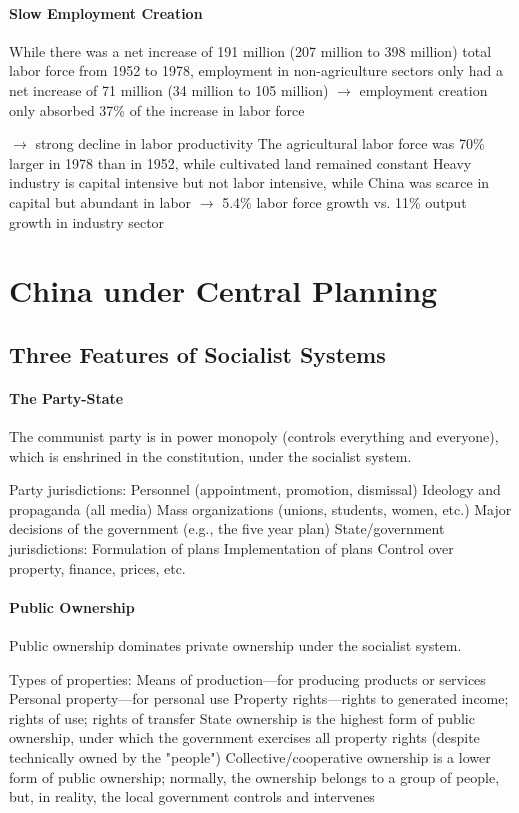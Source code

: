 \documentclass[11pt]{article}
\theoremstyle{definition}
\theoremstyle{remark}
\begin{document}
\paragraph{Slow Employment Creation}
While there was a net increase of 191 million (207 million to 398 million) total labor force from 1952 to 1978, employment in non-agriculture sectors only had a net increase of 71 million (34 million to 105 million) $\to$ employment creation only absorbed 37\% of the increase in labor force
\begin{outline}[enumerate] $\to$ strong decline in labor productivity
\1 The agricultural labor force was 70\% larger in 1978 than in 1952, while cultivated land remained constant
\1 Heavy industry is capital intensive but not labor intensive, while China was scarce in capital but abundant in labor $\to$ 5.4\% labor force growth vs. 11\% output growth in industry sector
\end{outline}
\clearpage

\section{China under Central Planning}
\subsection{Three Features of Socialist Systems}
\paragraph{The Party-State} The communist party is in power monopoly (controls everything and everyone), which is enshrined in the constitution, under the socialist system.
\begin{outline}[enumerate]
\1 Party jurisdictions:
	\2 Personnel (appointment, promotion, dismissal)
	\2 Ideology and propaganda (all media)
	\2 Mass organizations (unions, students, women, etc.)
	\2 Major decisions of the government (e.g., the five year plan)
\1 State/government jurisdictions:
	\2 Formulation of plans
	\2 Implementation of plans
	\2 Control over property, finance, prices, etc.
\end{outline}

\paragraph{Public Ownership} Public ownership dominates private ownership under the socialist system.
\begin{outline}[enumerate]
\1 Types of properties:
	\2 Means of production---for producing products or services
	\2 Personal property---for personal use
\1 Property rights---rights to generated income; rights of use; rights of transfer
	\2 State ownership is the highest form of public ownership, under which the government exercises all property rights (despite technically owned by the "people")
	\2 Collective/cooperative ownership is a lower form of public ownership; normally, the ownership belongs to a group of people, but, in reality, the local government controls and intervenes
\end{outline}
\end{document}
